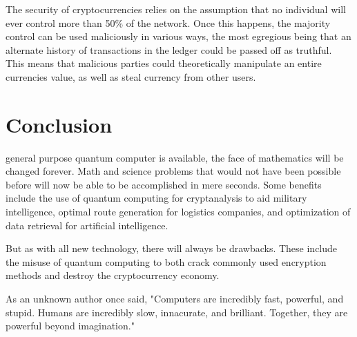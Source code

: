 \documentclass[10pt,journal,compsoc]{IEEEtran}
\begin{document}
The security of cryptocurrencies relies on the assumption that no individual will ever control more than 50\% of the network\cite{Futurism}. Once this happens, the majority control can be used maliciously in various ways, the most egregious being that an alternate history of transactions in the ledger could be passed off as truthful. This means that malicious parties could theoretically manipulate an entire currencies value, as well as steal currency from other users. 







\section{Conclusion}
 general purpose quantum computer is available, the face of mathematics will be changed forever. Math and science problems that would not have been possible before will now be able to be accomplished in mere seconds. Some benefits include the use of quantum computing for cryptanalysis to aid military intelligence, optimal route generation for logistics companies, and optimization of data retrieval for artificial intelligence. 

But as with all new technology, there will always be drawbacks. These include the misuse of quantum computing to both crack commonly used encryption methods and destroy the cryptocurrency economy.

As an unknown author once said, "Computers are incredibly fast, powerful, and stupid. Humans are incredibly slow, innacurate, and brilliant. Together, they are powerful beyond imagination."

\end{document}
